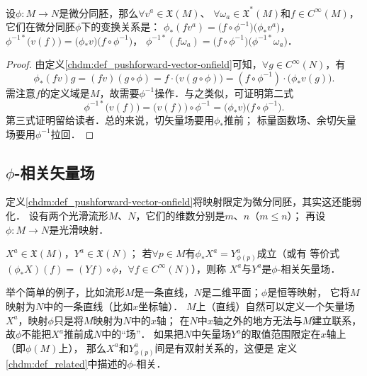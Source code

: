 \begin{proposition}\label{chdm:thm_fxxf}
    设$\phi:M\to N$是微分同胚，那么$\forall v^a \in\mathfrak{X}(M)$、
    $\forall \omega_a \in\mathfrak{X}^{*}(M)$和$f\in C^\infty(M)$，
    它们在微分同胚$\phi$下的变换关系是：
    $\phi_{*} (f v^a) = \bigl(f\circ\phi^{-1}\bigr) \bigl( \phi_{*} v^a \bigr)$，
    $\phi^{-1*} \bigl(v(f)\bigr) = \bigl( \phi_{*} v \bigr)\bigl(f\circ\phi^{-1}\bigr)$，
    $\phi^{-1*}(f \omega_a) = \bigl(f\circ\phi^{-1}\bigr)\bigl(\phi^{-1*}\omega_a\bigr)$．
\end{proposition}
\begin{proof}
    由定义\ref{chdm:def_pushforward-vector-onfield}可知，$\forall g\in C^\infty(N)$，有
    \begin{equation}
        \phi_{*} (f v) g = (f v)(g\circ \phi) =f\cdot \bigl(v(g\circ \phi)\bigr)
        =(f\circ \phi^{-1})\cdot \bigl(\phi_{*} v(g)\bigr).
    \end{equation}
    需注意$f$的定义域是$M$，故需要$\phi^{-1}$操作．与之类似，可证明第二式
    \begin{equation}
        \phi^{-1*} \bigl(v(f)\bigr) = \bigl(v(f)\bigr) \circ \phi^{-1}
        =\bigl( \phi_{*} v \bigr)  \bigl(f\circ\phi^{-1}\bigr) .
    \end{equation}
    第三式证明留给读者．总的来说，切矢量场要用$\phi_{*}$推前；
    标量函数场、余切矢量场要用$\phi^{-1}$拉回．
\end{proof}


\subsection{$\phi$-相关矢量场}\label{chdm:sec_related}
定义\ref{chdm:def_pushforward-vector-onfield}将映射限定为微分同胚，其实这还能弱化．
设有两个光滑流形$M$、$N$，它们的维数分别是$m$、$n$（$m\leqslant n$）；
再设$\phi:M\to N$是光滑映射． 

\begin{definition}\label{chdm:def_related}
    $X^a\in \mathfrak{X}(M)$，$Y^a\in \mathfrak{X}(N)$；
    若$\forall p\in M$有$\phi_{*} X^a = Y^a_{\phi(p)}$成立（或有
    等价式$(\phi_{*}X)(f)= (Yf)\circ\phi$，$\forall f\in C^\infty(N)$），则称
    $X^a$与$Y^a$是$\phi$-{\heiti 相关矢量场}．
\end{definition}

举个简单的例子，比如流形$M$是一条直线，$N$是二维平面；$\phi$是恒等映射，
它将$M$映射为$N$中的一条直线（比如$x$坐标轴）．
$M$上（直线）自然可以定义一个矢量场$X^a$，映射$\phi$只是将$M$映射为$N$中的$x$轴；
在$N$中$x$轴之外的地方无法与$M$建立联系，故$\phi$不能把$X^a$推前成$N$中的“场”．
如果把$N$中矢量场$Y^a$的取值范围限定在$x$轴上（即$\phi(M)$上），
那么$X^a$和$Y^a_{\phi(p)}$间是有双射关系的，这便是
定义\ref{chdm:def_related}中描述的$\phi$-相关．

